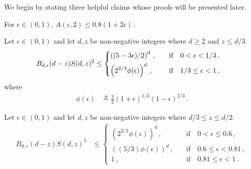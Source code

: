 We begin by stating three helpful claims 
whose proofs will be presented later.

\begin{claim}\label{claim:multiple-honest-blocks}
  For $\epsilon \in (0, 1)$, 
  $
    A(\epsilon, 2) 
    \leq 0.8 (1 + 2 \epsilon)
    \,.
  $
\end{claim}





\begin{claim}\label{claim:t1star-variance-exact}
  Let $\epsilon \in (0,1)$ and 
  let $d,z$ be non-negative integers where $d \geq 2$ and $z \leq d/3$. 
  \begin{align*}
    B_{d, \epsilon}(d-z) S(d,z)^2
    &\leq \begin{dcases} 
    \left( (5-3 \epsilon)/2 \right)^d \,,
        &\quad \text{if}\quad
        0 < \epsilon < 1/3 \,, \\
    \left( 2^{2/3} \phi(\epsilon) \right)^d \,,
        &\quad \text{if}\quad
        1/3 \leq \epsilon < 1 \, ,
    \end{dcases}
  \end{align*}
  where
  \begin{align}
    \phi(\epsilon) 
    &\triangleq \frac{3}{2} (1+\epsilon)^{1/3} (1-\epsilon)^{2/3}\label{eq:phi_eps} 
    \,.
  \end{align}
\end{claim}

\begin{claim}\label{claim:t2star-variance-exact}
  Let $\epsilon \in (0,1)$ and 
  let $d,z$ be non-negative integers where $d/3 \leq z \leq d/2$. 
  \begin{align*}
    B_{d, \epsilon}(d-z) S(d,z)^2
    &\leq \begin{cases} 
    \left( 2^{2/3} \phi(\epsilon) \right)^d \,,
        &\quad\text{if}\quad 0 < \epsilon \leq 0.6\,, \\
    \left( (5/3) \phi(\epsilon)  \right)^d \,,
        &\quad\text{if}\quad 0.6\leq \epsilon < 0.81\,, \\
    1 \,,
        &\quad\text{if}\quad 0.81 \leq \epsilon < 1
        \,.
    \end{cases}
  \end{align*}
\end{claim}


